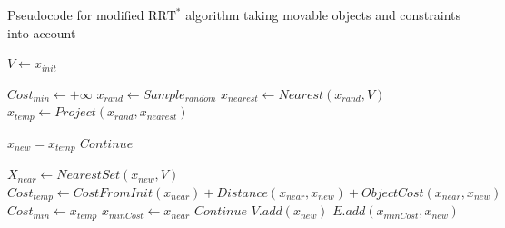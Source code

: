 \newpage
\begin{algorithm}[H]
\caption{Pseudocode for modified $\text{RRT}^*$ algorithm taking movable objects and constraints into account}
\label{pseudocode:proposed_rrt_star}
\begin{algorithmic}[1]

\hspace{-0.9cm}\colorbox{my_grey}{\parbox{\linewidth}{%
\State $V \leftarrow x_{init}$

\hspace{-0.1cm}\colorbox{my_light_blue}{\parbox{\linewidth}{%
    \State $Cost_{min} \leftarrow +\infty$ 
    \State $x_{rand} \leftarrow Sample_{random}$
    \State $x_{nearest} \leftarrow Nearest(x_{rand}, V)$
    \State $x_{temp} \leftarrow Project(x_{rand}, x_{nearest})$

        \State $x_{new} = x_{temp}$
        \Else
        \State $Continue$
    \EndIf
}}

\hspace{-0.1cm}\colorbox{my_yellow}{\parbox{\linewidth}{%
    \State $X_{near} \leftarrow NearestSet(x_{new}, V)$ 
    \State $Cost_{temp} \leftarrow CostFromInit(x_{near}) + Distance(x_{near}, x_{new}) + ObjectCost(x_{near}, x_{new})$
            \State $Cost_{min} \leftarrow x_{temp}$
            \State $x_{minCost} \leftarrow x_{near}$
            \EndIf
        \EndIf
    \EndFor
        \State $Continue$
    \Else
        \State $V.add(x_{new})$
        \State $E.add(x_{minCost}, x_{new})$
    \EndIf
}}

}}
\end{algorithmic}
\end{algorithm}
